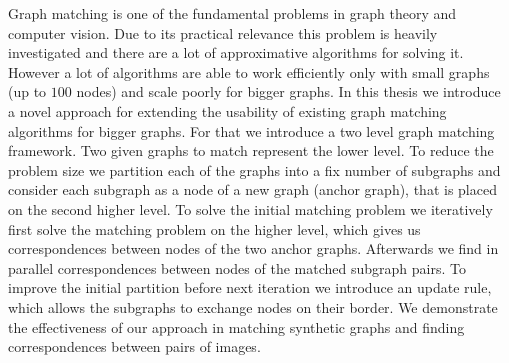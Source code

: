 Graph matching is one of the fundamental problems in graph theory and computer vision. Due to its practical relevance this problem is heavily investigated and there are a lot of approximative algorithms for solving it.
However a lot of algorithms are able to work efficiently only with small graphs (up to $100$ nodes) and scale poorly for bigger graphs. In this thesis we introduce a novel approach for extending the usability of existing graph matching algorithms for bigger graphs. For that we introduce a two level graph matching framework. Two given graphs to match represent the lower level. To reduce the problem size we partition each of the graphs into a fix number of subgraphs and consider each subgraph as a node of a new graph (anchor graph), that is placed on the second higher level. To solve the initial matching problem we iteratively first solve the matching problem on the higher level, which gives us correspondences between nodes of the two anchor graphs. Afterwards we find in parallel correspondences between nodes of the matched subgraph pairs. To improve the initial partition before next iteration we introduce an update rule, which allows the subgraphs to exchange nodes on their border. We demonstrate the effectiveness of our approach in matching synthetic graphs and finding correspondences between pairs of images.